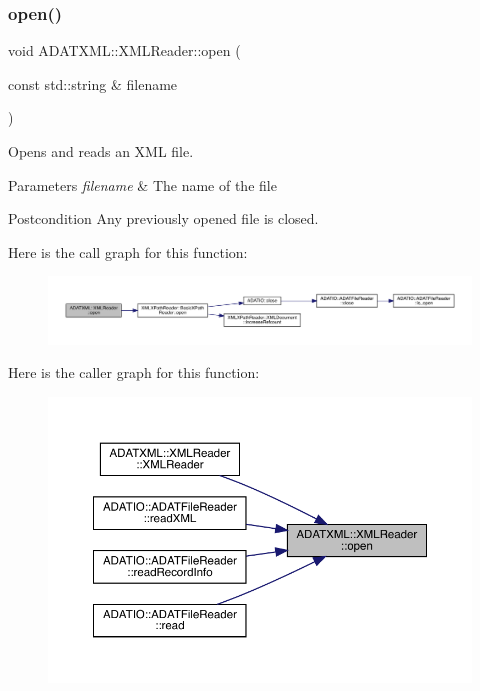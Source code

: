 \subsubsection{\texorpdfstring{open()}{open()}\hspace{0.1cm}{\footnotesize\ttfamily [1/6]}}
{\footnotesize\ttfamily void A\+D\+A\+T\+X\+M\+L\+::\+X\+M\+L\+Reader\+::open (\begin{DoxyParamCaption}\item[{const std\+::string \&}]{filename }\end{DoxyParamCaption})\hspace{0.3cm}{\ttfamily [inline]}}



Opens and reads an X\+ML file. 


\begin{DoxyParams}{Parameters}
{\em filename} & The name of the file \\
\hline
\end{DoxyParams}
\begin{DoxyPostcond}{Postcondition}
Any previously opened file is closed. 
\end{DoxyPostcond}
Here is the call graph for this function\+:
\nopagebreak
\begin{figure}[H]
\begin{center}
\leavevmode
\includegraphics[width=350pt]{db/d3f/classADATXML_1_1XMLReader_ad5dcbd08800bc67ac4a91f93cb1504b0_cgraph}
\end{center}
\end{figure}
Here is the caller graph for this function\+:\nopagebreak
\begin{figure}[H]
\begin{center}
\leavevmode
\includegraphics[width=350pt]{db/d3f/classADATXML_1_1XMLReader_ad5dcbd08800bc67ac4a91f93cb1504b0_icgraph}
\end{center}
\end{figure}
\mbox{\label{classADATXML_1_1XMLReader_ad5dcbd08800bc67ac4a91f93cb1504b0}} 

